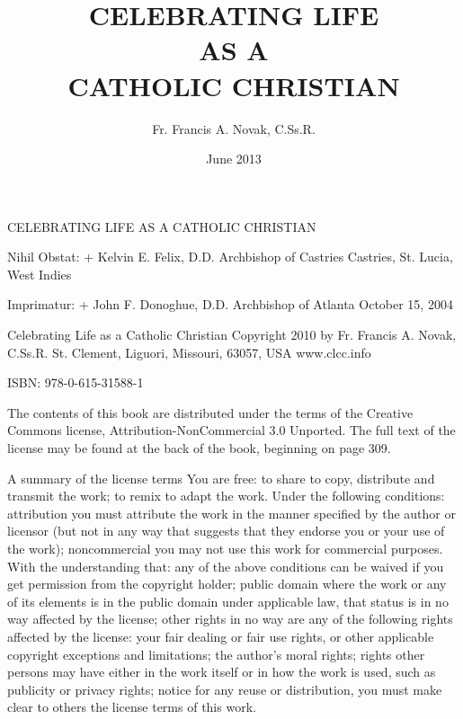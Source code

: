 \documentclass[oneside]{book}
\title{\textbf{CELEBRATING LIFE} \\ AS A \\ \textbf{CATHOLIC CHRISTIAN}}
\author{Fr. Francis A. Novak, C.Ss.R.}  \date{June 2013}
\begin{document}
\pagestyle{plain}


\frontmatter

\setcounter{secnumdepth}{-1}
\section*{} 

CELEBRATING LIFE AS A CATHOLIC CHRISTIAN


Nihil Obstat: + Kelvin E. Felix, D.D.  Archbishop of Castries Castries,
St. Lucia, West Indies

Imprimatur: + John F. Donoghue, D.D.  Archbishop of Atlanta October 15, 2004

Celebrating Life as a Catholic Christian Copyright 2010 by Fr. Francis A. Novak,
C.Ss.R.  St. Clement, Liguori, Missouri, 63057, USA www.clcc.info

ISBN: 978-0-615-31588-1

The contents of this book are distributed under the terms of the Creative
Commons license, Attribution-NonCommercial 3.0 Unported. The full text of the
license may be found at the back of the book, beginning on page 309.

A summary of the license terms You are free: to share to copy, distribute and
transmit the work; to remix to adapt the work. Under the following conditions:
attribution you must attribute the work in the manner specified by the author or
licensor (but not in any way that suggests that they endorse you or your use of
the work); noncommercial you may not use this work for commercial purposes. With
the understanding that: any of the above conditions can be waived if you get
permission from the copyright holder; public domain where the work or any of its
elements is in the public domain under applicable law, that status is in no way
affected by the license; other rights in no way are any of the following rights
affected by the license: your fair dealing or fair use rights, or other
applicable copyright exceptions and limitations; the author's moral rights;
rights other persons may have either in the work itself or in how the work is
used, such as publicity or privacy rights; notice for any reuse or distribution,
you must make clear to others the license terms of this work.
\end{document}

